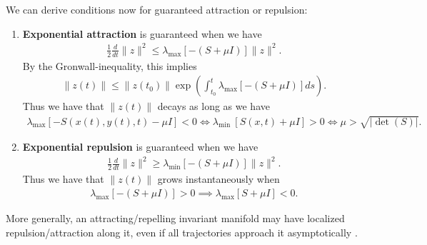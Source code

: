 \begin{ex}
We can derive conditions now for guaranteed attraction or repulsion:
\begin{enumerate}
	\item \textbf{Exponential attraction} is guaranteed when we have
		\begin{align}
			\frac{1}{2} \frac{d}{dt}\| z\| ^{2} \leq \lambda_{ \textrm{max} } \left[ -( S + \mu I) \right] \|z \|^{2}.
		\end{align}
		By the Gronwall-inequality, this implies
		\begin{align}
			\| z(t) \| \leq \| z(t_0)\| \exp\left( \int_{t_0}^{t} \lambda_{ \textrm{max} }[-(S + \mu I) ]ds \right).
		\end{align}
		Thus we have that $\|z(t)\|$ decays as long as we have
		\begin{align}
			\lambda_{ \textrm{max} }\left[ - S(x(t), y(t), t) - \mu I \right] < 0 
			\Leftrightarrow 
			\lambda _{ \textrm{min } } \left[ S(x,t) + \mu I \right] >0
			\Leftrightarrow
			\mu  > \sqrt{|\det(S)|}.
		\end{align}
	\item \textbf{Exponential repulsion} is guaranteed when we have  	
		\begin{align}
			\frac{1}{2} \frac{d}{dt}\| z\| ^{2} \geq \lambda_{ \textrm{min} } \left[ - (S + \mu I) \right] \|z \|^{2}.
		\end{align}
		Thus we have that $\|z(t)\|$ grows instantaneously when
		\begin{align}
			\lambda_{ \textrm{max} }\left[  -(S + \mu I) \right] > 0 \implies \lambda _{ \textrm{max} } \left[S + \mu I \right] < 0. 
		\end{align}
\end{enumerate}

More generally, an attracting/repelling invariant manifold may have localized repulsion/attraction along it, even if all trajectories approach it asymptotically \cite{Sapsis2010}.
\end{ex}

